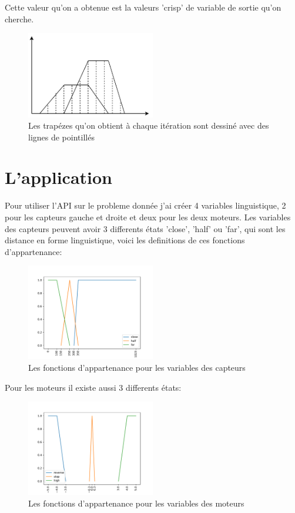 \documentclass{article}
\begin{document}
Cette valeur qu'on a obtenue est la valeurs 'crisp' de variable de sortie qu'on
cherche.

\begin{figure}
  \centering
      \includegraphics[width=0.5\textwidth]{defuzz.pdf}
  \caption{Les trapézes qu'on obtient à chaque itération sont dessiné avec des
   lignes de pointillés}
\end{figure}


\section{L'application}

Pour utiliser l'API sur le probleme donnée j'ai créer 4 variables linguistique,
2 pour les capteurs gauche et droite et deux pour les deux moteurs. Les
variables des capteurs peuvent avoir 3 differents états 'close', 'half' ou
'far', qui sont les distance en forme linguistique, voici les definitions de ces
fonctions d'appartenance:
\begin{figure} [H]
  \centering
      \includegraphics[width=0.5\textwidth]{sensor.pdf}
  \caption{Les fonctions d'appartenance pour les variables des capteurs}
\end{figure}

Pour les moteurs il existe aussi 3 differents états:
\begin{figure} [H]
  \centering
      \includegraphics[width=0.5\textwidth]{motor.pdf}
  \caption{Les fonctions d'appartenance pour les variables des moteurs}
\end{figure}
\end{document}
